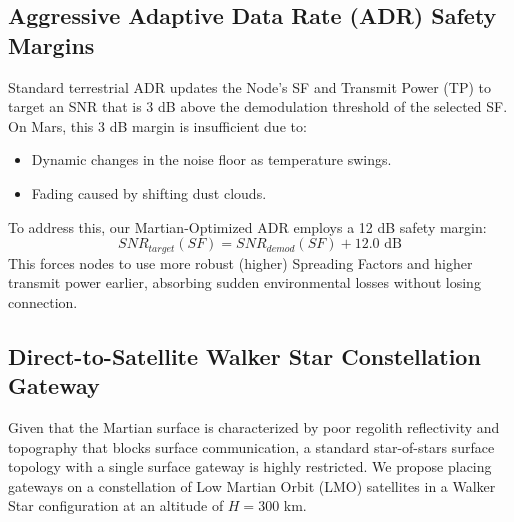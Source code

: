 \documentclass{ijuc}
\begin{document}
\subsection{Aggressive Adaptive Data Rate (ADR) Safety Margins}
Standard terrestrial ADR updates the Node's SF and Transmit Power (TP) to target an SNR that is 3 dB above the demodulation threshold of the selected SF. On Mars, this 3 dB margin is insufficient due to:
\begin{itemize}
    \item Dynamic changes in the noise floor as temperature swings.
    \item Fading caused by shifting dust clouds.
\end{itemize}
To address this, our Martian-Optimized ADR employs a 12 dB safety margin:
\begin{equation}
    SNR_{target}(SF) = SNR_{demod}(SF) + 12.0 \text{ dB}
\end{equation}
This forces nodes to use more robust (higher) Spreading Factors and higher transmit power earlier, absorbing sudden environmental losses without losing connection.

\subsection{Direct-to-Satellite Walker Star Constellation Gateway}
Given that the Martian surface is characterized by poor regolith reflectivity and topography that blocks surface communication, a standard star-of-stars surface topology with a single surface gateway is highly restricted. We propose placing gateways on a constellation of Low Martian Orbit (LMO) satellites in a Walker Star configuration at an altitude of $H = 300$ km. 
\end{document}
